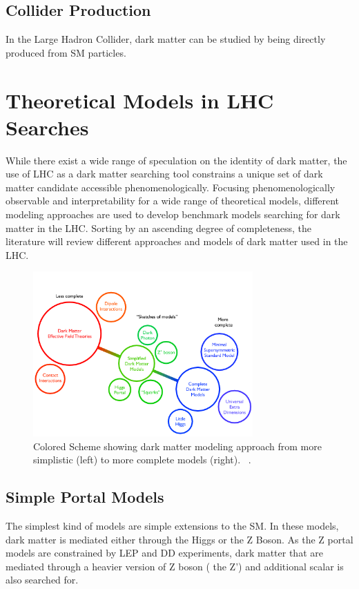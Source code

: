 \subsection{Collider Production} 
    In the Large Hadron Collider, dark matter can be studied by being directly produced from SM particles.

\section{Theoretical Models in LHC Searches}
\label{section:models}

While there exist a wide range of speculation on the identity of dark matter, the use of LHC as a dark matter searching tool constrains a unique set of dark matter candidate accessible phenomenologically. 
Focusing phenomenologically observable and interpretability for a wide range of theoretical models, different modeling approaches are used to develop benchmark models searching for dark matter in the LHC.
Sorting by an ascending degree of completeness, the literature will review different approaches and models of dark matter used in the LHC.


\begin{figure}[!htb]
    \begin{center}
        \includegraphics[width=0.75\textwidth]{figures/chapter_DM/Model}
        \caption{
			Colored Scheme showing dark matter modeling approach from more simplistic (left) to more complete models (right).  ~\cite{Abdallah:2024101}.
        }
        \label{fig:Model_figure}
    \end{center}
\end{figure}



\subsection{Simple Portal Models}
The simplest kind of models are simple extensions to the SM. In these models, dark matter is mediated either through the Higgs or the Z Boson. As the Z portal models are constrained by LEP and DD experiments, dark matter that are mediated through a heavier version of Z boson ( the Z') and additional scalar is also searched for. 

